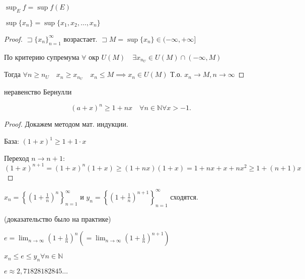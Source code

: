 \documentclass{book}
\newcommand\N{\ensuremath{\mathbb{N}}}
\theoremstyle{definition}
\begin{document}
$\sup_Ef = \sup f(E)$

$\sup\{x_{n}\} = \sup\{x_1, x_2, \ldots, x_{n} \}$

\begin{proof}
    $\sqsupset \{x_{n} \}_{n=1}^{\infty }$ возрастает. $\sqsupset M = \sup\{x_{n} \}\in (-\infty , +\infty ]$

    По критерию супремума $\forall $ окр $U(M)\quad \exists x_{n_U}\in U(M)\cap (-\infty , M)$

    Тогда $\forall n\geqslant n_U\quad x_n\geqslant x_{n_U}\quad x_n\leqslant M \implies x_n\in U(M)$ Т.о. $x_n\to M, n\to \infty $
\end{proof}

\begin{statement}
    неравенство Бернулли

    \[
        (a+x)^n\geqslant 1+nx\quad \forall n\in \N \forall x>-1
    .\] 
\end{statement}
\begin{proof}
    Докажем методом мат. индукции. 

    База: $(1+x)^1\geqslant 1+1\cdot x$

    Переход $n\to n+1$: $ (1+x)^{n+1} = (1+x)^n(1+x)\geqslant (1+nx)(1+x) = 1+nx+x+nx^2\geqslant 1+(n+1)x$
\end{proof}

\begin{theorem}
    $x_{n}  = \left\{ (1+\frac{1}{n})^n \right\} _{n=1}^{\infty }$ и $y_{n} = \left\{ \left( 1+\frac{1}{n} \right) ^{n+1} \right\}_{n=1}^{\infty } $ сходятся.

    (доказательство было на практике)

    $e = \lim_{n \to \infty} \left( 1+\frac{1}{n} \right) ^n\left( =\lim_{n \to \infty } \left( 1+\frac{1}{n} \right) ^{n+1} \right)$

    $x_n\leqslant e\leqslant y_{n} \forall n\in \N $

    $e\approx 2,71828182845\ldots$
\end{theorem}
\end{document}
